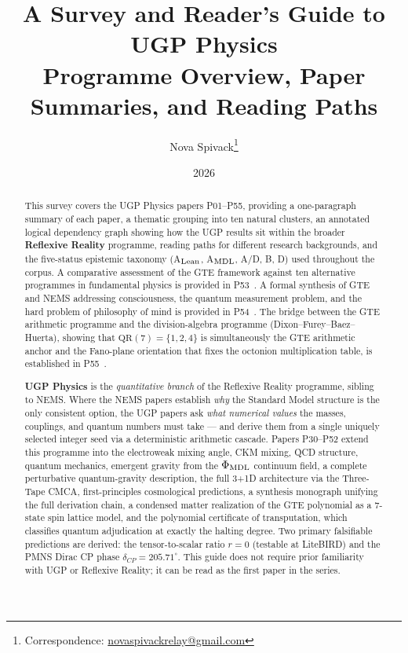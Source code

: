 \documentclass[11pt]{article}
\title{\vspace{-0.6em}\bfseries A Survey and Reader's Guide to UGP Physics\\[0.3em]
\large\normalfont Programme Overview, Paper Summaries, and Reading Paths}
\author[1]{Nova Spivack\thanks{Correspondence:
  \href{mailto:novaspivackrelay@gmail.com}{novaspivackrelay@gmail.com}}}
\affil[1]{Independent Research}
\date{2026}
\begin{document}
\maketitle
\NovaZenodoAfterTitle

\begin{abstract}
This survey covers the UGP Physics papers P01--P55, providing a one-paragraph
summary of each paper, a thematic grouping into ten natural clusters, an annotated
logical dependency graph showing how the UGP results sit within the broader
\textbf{Reflexive Reality} programme, reading paths for different research backgrounds,
and the five-status epistemic taxonomy (A$_{\rm Lean}$, A$_{\rm MDL}$, A/D, B, D)
used throughout the corpus.
A comparative assessment of the GTE framework against ten alternative programmes in
fundamental physics is provided in P53~\cite{SpivackGTEFrameworkAssessment}.
A formal synthesis of GTE and NEMS addressing consciousness, the quantum measurement
problem, and the hard problem of philosophy of mind is provided in
P54~\cite{SpivackFireInTheEquations}.
The bridge between the GTE arithmetic programme and the division-algebra programme
(Dixon--Furey--Baez--Huerta), showing that $\mathrm{QR}(7)=\{1,2,4\}$ is
simultaneously the GTE arithmetic anchor and the Fano-plane orientation that
fixes the octonion multiplication table, is established in
P55~\cite{SpivackOctonionicShadow}.

\textbf{UGP Physics} is the \emph{quantitative branch} of the Reflexive Reality programme, sibling to NEMS.  Where the NEMS papers establish \emph{why}
the Standard Model structure is the only consistent option, the UGP papers ask
\emph{what numerical values} the masses, couplings, and quantum numbers must take
--- and derive them from a single uniquely selected integer seed via a deterministic
arithmetic cascade.  Papers P30--P52 extend this programme into the electroweak
mixing angle, CKM mixing, QCD structure, quantum mechanics, emergent gravity
from the $\Phi_{\rm MDL}$ continuum field, a complete perturbative quantum-gravity
description, the full 3+1D architecture via the Three-Tape CMCA, first-principles
cosmological predictions, a synthesis monograph unifying the full derivation chain,
a condensed matter realization of the GTE polynomial as a 7-state spin lattice model,
and the polynomial certificate of transputation, which classifies quantum
adjudication at exactly the halting degree.
Two primary falsifiable predictions are derived: the tensor-to-scalar ratio $r = 0$
(testable at LiteBIRD) and the PMNS Dirac CP phase $\delta_{CP} = 205.71^\circ$.
This guide does not require prior familiarity with UGP or Reflexive
Reality; it can be read as the first paper in the series.
\end{abstract}
\end{document}
